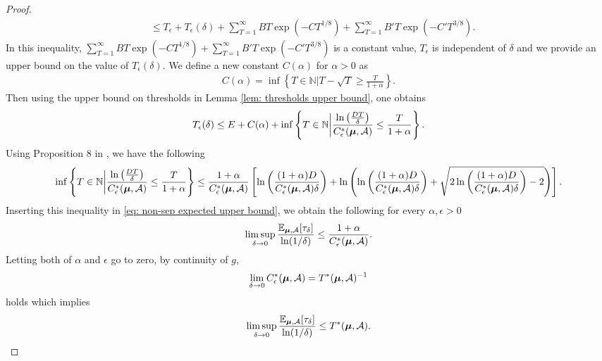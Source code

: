 \begin{proof}
\begin{align}
                           &\leq T_{\epsilon} +  T_{\epsilon}(\delta) +  \sum_{T=1}^{\infty} BT \exp(-CT^{1/8}) + \sum_{T=1}^{\infty} B'T \exp(-C'T^{3/8})  \label{eq: non-sep expected upper bound}.
        \end{align}
        In this inequality, $\sum_{T=1}^{\infty} BT \exp(-CT^{1/8}) + \sum_{T=1}^{\infty} B'T \exp(-C'T^{3/8}) $ is a constant value, $T_{\epsilon}$ is independent of $\delta$ and we provide an upper bound on the value of $T_{\epsilon}(\delta)$. We define a new constant $C(\alpha)$ for $\alpha > 0$ as
        \begin{align*}
            C(\alpha) = \inf \left\{ T \in \mathbb{N} \bigg| T - \sqrt{T} \geq \frac{T}{1 + \alpha} \right\}.
        \end{align*}
        Then using the upper bound on thresholds in Lemma \ref{lem: thresholds upper bound}, one obtains
        \begin{align*}
            T_{\epsilon}(\delta) \leq E + C(\alpha) + \inf \left\{ T \in \mathbb{N} \bigg| \frac{\ln \left( \frac{DT}{\delta} \right)}{C^*_{\epsilon}(\boldsymbol{\mu}, \mathcal{A})} \leq \frac{T}{1 + \alpha} \right\}. 
        \end{align*}
        Using Proposition $8$ in \cite{kaufmann2021mixture}, we have the following
        \begin{align*}
            \inf \left\{ T \in \mathbb{N} \bigg| \frac{\ln \left( \frac{DT}{\delta} \right)}{C^*_{\epsilon}(\boldsymbol{\mu}, \mathcal{A})} \leq \frac{T}{1 + \alpha} \right\} \leq \frac{1 + \alpha}{C^*_{\epsilon}(\boldsymbol{\mu}, \mathcal{A})} \left[ \ln \left( \frac{(1 + \alpha)D}{C^*_{\epsilon}(\boldsymbol{\mu}, \mathcal{A}) \delta} \right) + \ln \left( \ln \left( \frac{(1 + \alpha)D}{C^*_{\epsilon}(\boldsymbol{\mu}, \mathcal{A}) \delta} \right) + \sqrt{2 \ln \left( \frac{(1 + \alpha)D}{C^*_{\epsilon}(\boldsymbol{\mu}, \mathcal{A}) \delta} \right) - 2} \right) \right]. 
        \end{align*}
        Inserting this inequality in \eqref{eq: non-sep expected upper bound}, we obtain the following for every $\alpha, \epsilon > 0$
        \begin{align*}
            \limsup_{\delta \rightarrow 0} \frac{\mathbb{E}_{\boldsymbol{\mu}, \mathcal{A}} [\tau_{\delta}]}{\ln(1 / \delta)} \leq \frac{1 + \alpha}{C^*_{\epsilon}(\boldsymbol{\mu}, \mathcal{A})}.
        \end{align*}
        Letting both of $\alpha$ and $\epsilon$ go to zero, by continuity of $g$,
        \begin{align*}
            \lim_{\delta \rightarrow 0} C^*_{\epsilon}(\boldsymbol{\mu}, \mathcal{A}) = T^*(\boldsymbol{\mu}, \mathcal{A})^{-1}
        \end{align*}
        holds which implies 
        \begin{align*}
            \limsup_{\delta \rightarrow 0} \frac{\mathbb{E}_{\boldsymbol{\mu}, \mathcal{A}}[\tau_{\delta}]}{\ln(1 / \delta)} \leq T^*(\boldsymbol{\mu}, \mathcal{A}).
        \end{align*}     
    \end{proof}

